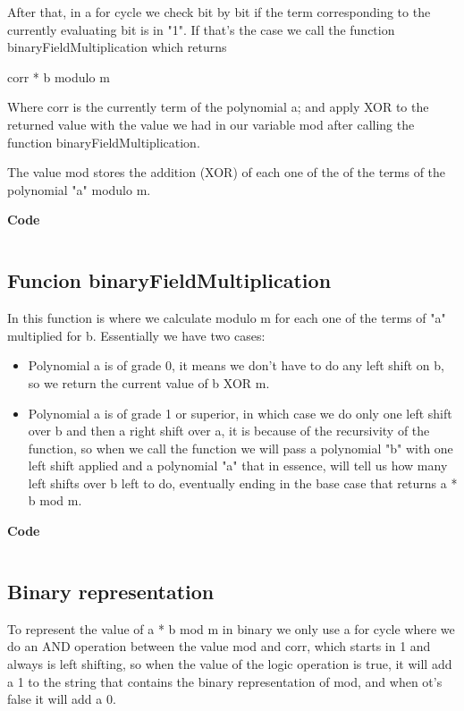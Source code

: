 \documentclass[12pt]{article}
\begin{document}
            After that, in a for cycle we check bit by bit if the term corresponding to the currently evaluating bit is in "1". If that's the case we call the function binaryFieldMultiplication which returns 
            
            \begin{center}
                {corr * b modulo m}    
            \end{center}
            
            Where corr is the currently term of the polynomial a; and apply XOR to the returned value with the value we had in our variable mod after calling the function binaryFieldMultiplication.
            
            The value mod stores the addition (XOR) of each one of the of the terms of the polynomial "a" modulo m.
            
            \newpage
            \noindent\Checkmark\textbf{Code}
                    \inputminted{c++}{Code/modulo_m.c}
            
        \subsection{Funcion binaryFieldMultiplication}
            In this function is where we calculate modulo m for each one of the terms of "a" multiplied for b. Essentially we have two cases:
            
            \begin{itemize}
                \item Polynomial a is of grade 0, it means we don't have to do any left shift on b, so we return the current value of b XOR m.
            
                \item Polynomial a is of grade 1 or superior, in which case we do only one left shift over b and then a right shift over a, it is because of the recursivity of the function, so when we call the function we will pass a polynomial "b" with one left shift applied and a polynomial "a" that in essence, will tell us how many left shifts over b left to do, eventually ending in the base case that returns {a * b mod m}.  
            \end{itemize}
            
            \noindent\Checkmark\textbf{Code}
                    \inputminted{c++}{Code/binFieldMult.c}
                    
        \subsection{Binary representation}
            To represent the value of {a * b mod m} in binary we only use a for cycle where we do an AND operation between the value mod and corr, which starts in 1 and always is left shifting, so when the value of the logic operation is true, it will add a 1 to the string that contains the binary representation of mod, and when ot's false it will add a 0. 
            
\end{document}
